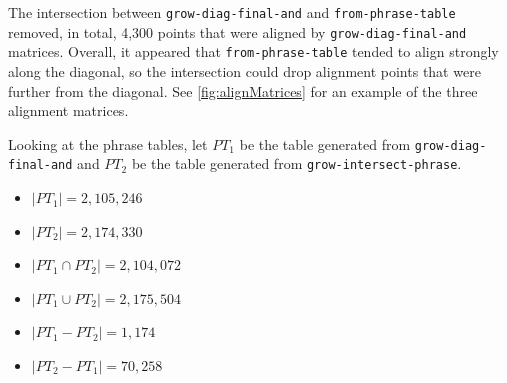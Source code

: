 \documentclass[twocolumn]{article}
\newcommand{\originalAlign}{\texttt{grow-diag-final-and}}
\newcommand{\phraseAlign}{\texttt{from-phrase-table}}
\newcommand{\phraseIntersectAlign}{\texttt{grow-intersect-phrase}}
\begin{document}
The intersection between \originalAlign{} and \phraseAlign{} removed, in total,
4,300 points that were aligned by \originalAlign{} matrices. Overall, it
appeared that \phraseAlign{} tended to align strongly along the diagonal, so the
intersection could drop alignment points that were further from the
diagonal. See \ref{fig:alignMatrices} for an example of the three alignment
matrices.

Looking at the phrase tables,
let $PT_1$ be the table generated from \originalAlign{}
and $PT_2$ be the table generated from \phraseIntersectAlign{}.
\begin{itemize}
  \item $|PT_1| = 2,105,246$
  \item $|PT_2| = 2,174,330$
  \item $|PT_1 \cap PT_2| = 2,104,072$
  \item $|PT_1 \cup PT_2| = 2,175,504$
  \item $|PT_1 - PT_2| = 1,174$
  \item $|PT_2 - PT_1| = 70,258$
\end{itemize}




\end{document}
